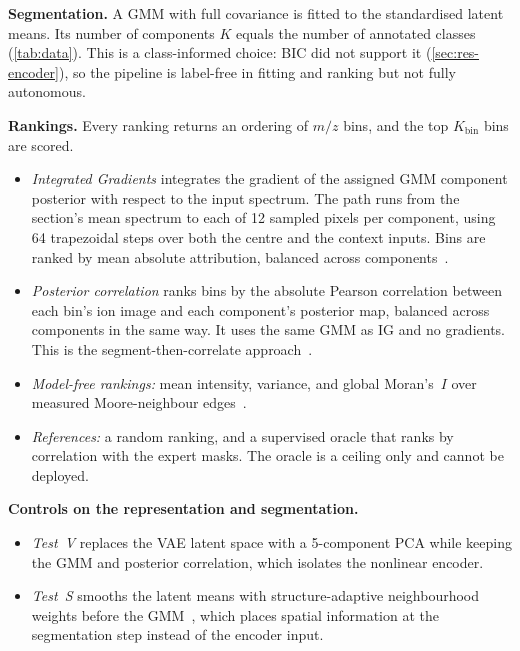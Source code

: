 \textbf{Segmentation.} A GMM with full covariance is fitted to the standardised
latent means. Its number of components $K$ equals the number of annotated
classes (\cref{tab:data}). This is a class-informed choice: BIC did not
support it (\cref{sec:res-encoder}), so the pipeline is label-free in fitting
and ranking but not fully autonomous.

\textbf{Rankings.} Every ranking returns an ordering of $m/z$ bins, and the top
$K_{\text{bin}}$ bins are scored.
\begin{itemize}
  \item \emph{Integrated Gradients} integrates the gradient of the assigned GMM
        component posterior with respect to the input spectrum. The path runs
        from the section's mean spectrum to each of 12 sampled pixels per
        component, using 64 trapezoidal steps over both the centre and the
        context inputs. Bins are ranked by mean absolute attribution, balanced
        across components~\citep{sundararajan2017axiomatic}.
  \item \emph{Posterior correlation} ranks bins by the absolute Pearson
        correlation between each bin's ion image and each component's posterior
        map, balanced across components in the same way. It uses the same GMM
        as IG and no gradients. This is the segment-then-correlate
        approach~\citep{alexandrov2011efficient}.
  \item \emph{Model-free rankings:} mean intensity, variance, and global
        Moran's~$I$ over measured Moore-neighbour edges~\citep{moran1950notes}.
  \item \emph{References:} a random ranking, and a supervised oracle that ranks
        by correlation with the expert masks. The oracle is a ceiling only and
        cannot be deployed.
\end{itemize}

\textbf{Controls on the representation and segmentation.}
\begin{itemize}
  \item \emph{Test~V} replaces the VAE latent space with a 5-component PCA
        while keeping the GMM and posterior correlation, which isolates the
        nonlinear encoder.
  \item \emph{Test~S} smooths the latent means with structure-adaptive
        neighbourhood weights before the GMM~\citep{alexandrov2011efficient},
        which places spatial information at the segmentation step instead of
        the encoder input.
\end{itemize}


